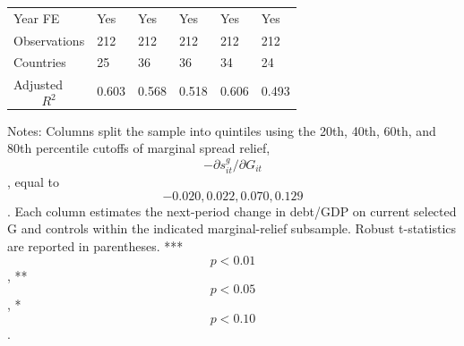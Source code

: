\begin{table}[H]
\begin{threeparttable}
\begin{tabularx}{\textwidth}{lYYYYY}
Year FE & Yes & Yes & Yes & Yes & Yes \\
Observations & 212 & 212 & 212 & 212 & 212 \\
Countries & 25 & 36 & 36 & 34 & 24 \\
Adjusted $$R^2$$ & 0.603 & 0.568 & 0.518 & 0.606 & 0.493 \\
\bottomrule
\end{tabularx}
\begin{tablenotes}[flushleft]\footnotesize
\item Notes: Columns split the sample into quintiles using the 20th, 40th, 60th, and 80th percentile cutoffs of marginal spread relief, $$-\partial s^g_{it}/\partial G_{it}$$, equal to $$-0.020, 0.022, 0.070, 0.129$$. Each column estimates the next-period change in debt/GDP on current selected G and controls within the indicated marginal-relief subsample. Robust t-statistics are reported in parentheses. *** $$p<0.01$$, ** $$p<0.05$$, * $$p<0.10$$.
\end{tablenotes}
\end{threeparttable}
\end{table}
